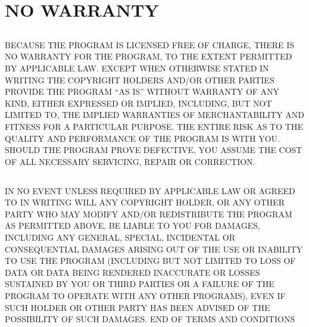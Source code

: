 \documentclass[a4paper, 12pt]{article}
\begin{document}
\section*{NO WARRANTY}

\subsection{}

BECAUSE THE PROGRAM IS LICENSED FREE OF CHARGE, THERE IS NO WARRANTY FOR THE PROGRAM, TO THE EXTENT PERMITTED BY APPLICABLE LAW. EXCEPT WHEN OTHERWISE STATED IN WRITING THE COPYRIGHT HOLDERS AND/OR OTHER PARTIES PROVIDE THE PROGRAM ``AS IS'' WITHOUT WARRANTY OF ANY KIND, EITHER EXPRESSED OR IMPLIED, INCLUDING, BUT NOT LIMITED TO, THE IMPLIED WARRANTIES OF MERCHANTABILITY AND FITNESS FOR A PARTICULAR PURPOSE. THE ENTIRE RISK AS TO THE QUALITY AND PERFORMANCE OF THE PROGRAM IS WITH YOU. SHOULD THE PROGRAM PROVE DEFECTIVE, YOU ASSUME THE COST OF ALL NECESSARY SERVICING, REPAIR OR CORRECTION.

\subsection{}

IN NO EVENT UNLESS REQUIRED BY APPLICABLE LAW OR AGREED TO IN WRITING WILL ANY COPYRIGHT HOLDER, OR ANY OTHER PARTY WHO MAY MODIFY AND/OR REDISTRIBUTE THE PROGRAM AS PERMITTED ABOVE, BE LIABLE TO YOU FOR DAMAGES, INCLUDING ANY GENERAL, SPECIAL, INCIDENTAL OR CONSEQUENTIAL DAMAGES ARISING OUT OF THE USE OR INABILITY TO USE THE PROGRAM (INCLUDING BUT NOT LIMITED TO LOSS OF DATA OR DATA BEING RENDERED INACCURATE OR LOSSES SUSTAINED BY YOU OR THIRD PARTIES OR A FAILURE OF THE PROGRAM TO OPERATE WITH ANY OTHER PROGRAMS), EVEN IF SUCH HOLDER OR OTHER PARTY HAS BEEN ADVISED OF THE POSSIBILITY OF SUCH DAMAGES. END OF TERMS AND CONDITIONS
\end{document}
